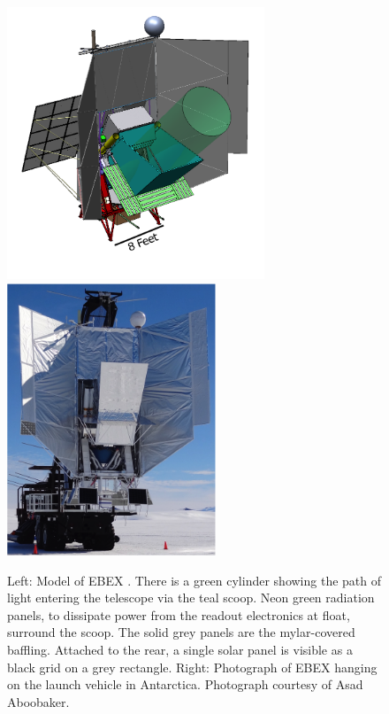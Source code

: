 \begin{figure}[htbp]
\begin{center}
\includegraphics[height=3.2in]{figures/ebex_model.png}
\includegraphics[height=3.2in]{figures/ebex_hanging.png}
\caption[EBEX model and photograph]{Left: Model of \ac{EBEX} \cite{Zilic2014}. There is a green cylinder showing the path of light entering the telescope via the teal scoop. Neon green radiation panels, to dissipate power from the readout electronics at float, surround the scoop. The solid grey panels are the mylar-covered baffling. Attached to the rear, a single solar panel is visible as a black grid on a grey rectangle. Right: Photograph of \ac{EBEX} hanging on the launch vehicle in Antarctica. Photograph courtesy of Asad Aboobaker. 
\label{fig:outer_frame} }
\end{center}
\end{figure}

